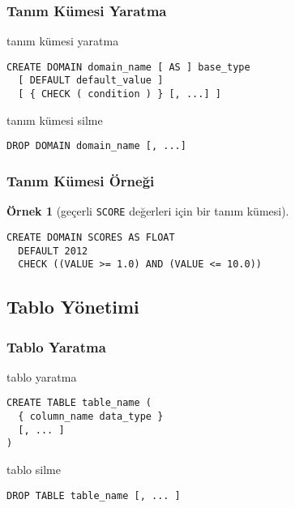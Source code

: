 \documentclass[dvipsnames]{beamer}
\theoremstyle{definition}
\theoremstyle{example}
\newtheorem{ornek}[theorem]{Örnek}
\theoremstyle{plain}
\begin{document}
\begin{frame}[fragile]
  \frametitle{Tanım Kümesi Yaratma}

  \begin{block}{tanım kümesi yaratma}
    \begin{lstlisting}
CREATE DOMAIN domain_name [ AS ] base_type
  [ DEFAULT default_value ]
  [ { CHECK ( condition ) } [, ...] ]
    \end{lstlisting}
  \end{block}

  \pause
  \medskip
  \begin{block}{tanım kümesi silme}
    \begin{lstlisting}
DROP DOMAIN domain_name [, ...]
    \end{lstlisting}
  \end{block}
\end{frame}

\begin{frame}[fragile]
  \frametitle{Tanım Kümesi Örneği}

  \begin{ornek}[geçerli \texttt{SCORE} değerleri için bir tanım kümesi]
    \begin{lstlisting}
CREATE DOMAIN SCORES AS FLOAT
  DEFAULT 2012
  CHECK ((VALUE >= 1.0) AND (VALUE <= 10.0))
    \end{lstlisting}
  \end{ornek}
\end{frame}

\subsection{Tablo Yönetimi}

\begin{frame}[fragile]
  \frametitle{Tablo Yaratma}

  \begin{block}{tablo yaratma}
    \begin{lstlisting}
CREATE TABLE table_name (
  { column_name data_type }
  [, ... ]
)
    \end{lstlisting}
  \end{block}

  \pause
  \medskip
  \begin{block}{tablo silme}
    \begin{lstlisting}
DROP TABLE table_name [, ... ]
    \end{lstlisting}
  \end{block}
\end{frame}
\end{document}
